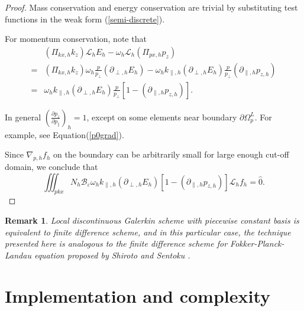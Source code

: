 \documentclass{article}
\newtheorem{remark}{Remark}
\numberwithin{equation}{section}
\begin{document}
\begin{proof}
    Mass conservation and energy conservation are trivial by substituting test functions in the weak form (\ref{semi-discrete}). 
    
    For momentum conservation, note that
    \begin{equation*}
        \begin{split}
            &\left(\Pi_{kx,h}k_{z}\right)\mathcal{L}_{h}E_{h}-\omega_{h}\mathcal{L}_{h}\left(\Pi_{px,h}p_{z}\right)\\
            =&\left(\Pi_{kx,h}k_{z}\right)\omega_{h}\frac{p}{p_{\perp}}\left(\partial_{\perp,h}E_{h}\right)-\omega_{h}k_{\parallel,h}\left(\partial_{\perp,h}E_{h}\right)\frac{p}{p_{\perp}}\left(\partial_{\parallel,h}p_{z,h}\right)\\
            =&\omega_{h}k_{\parallel,h}\left(\partial_{\perp,h}E_{h}\right)\frac{p}{p_{\perp}}\left[1-\left(\partial_{\parallel,h}p_{z,h}\right)\right].
        \end{split}
    \end{equation*}

    In general $\left(\frac{\partial p_{z}}{\partial p_{\parallel}}\right)_{h} = 1$, except on some elements near boundary $\partial \Omega^{L}_{p}$. For example, see Equation(\ref{p0grad}). 
    
    Since $\nabla_{p,h}f_{h}$ on the boundary can be arbitrarily small for large enough cut-off domain, we conclude that
    \begin{equation*}
        \iiint_{pkx}N_{h}\mathcal{B}_{\varepsilon}\omega_{h}k_{\parallel,h}\left(\partial_{\perp,h}E_{h}\right)\left[1-\left(\partial_{\parallel,h}p_{z,h}\right)\right]\mathcal{L}_{h}f_{h}=\hat{0}.
    \end{equation*}
\end{proof}

\begin{remark}
    Local discontinuous Galerkin scheme with piecewise constant basis is equivalent to finite difference scheme, and in this particular case, the technique presented here is analogous to the finite difference scheme for Fokker-Planck-Landau equation proposed by Shiroto and Sentoku \cite{shiroto2019structure}.  
\end{remark}

\section{Implementation and complexity} \label{sec:implement}
\end{document}
